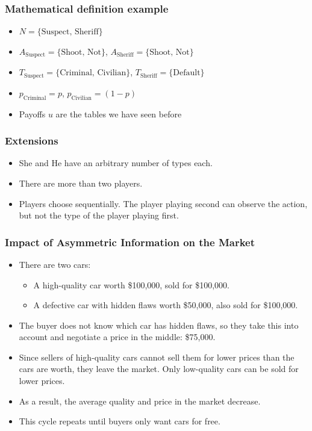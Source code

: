 \documentclass[11pt]{beamer}
\begin{document}
\begin{frame}
    \frametitle{{Mathematical definition example}}
    \begin{itemize}
        \item $N = \{\text{Suspect, Sheriff}\}$
        \item $A_{\text{Suspect}} = \{\text{Shoot, Not}\}$, $A_{\text{Sheriff}} = \{\text{Shoot, Not}\}$
        \item $T_{\text{Suspect}} = \{\text{Criminal, Civilian}\}$, $T_{\text{Sheriff}} = \{ \text{Default} \}$
        \item $p_{\text{Criminal}} = p$, $p_{\text{Civilian}} = (1 - p)$
        \item Payoffs $u$ are the tables we have seen before
    \end{itemize}
\end{frame}


\begin{frame}
    \frametitle{Extensions}
    \begin{itemize}
        \item She and He have an arbitrary number of types each.
        \item There are more than two players.
        \item Players choose sequentially. The player playing second can observe the action, but
        not the type of the player playing first.

    \end{itemize}
\end{frame}


\begin{frame}
    \frametitle{Impact of Asymmetric Information on the Market}

    \begin{itemize}
        \item There are two cars:
        \begin{itemize}
            \item A high-quality car worth \$100,000, sold for \$100,000.
            \item A defective car with hidden flaws worth \$50,000, also sold for \$100,000.
        \end{itemize}
        \item The buyer does not know which car has hidden flaws, so they take this into account and negotiate a price in the middle: \$75,000.
        \item Since sellers of high-quality cars cannot sell them for lower prices than the cars are worth, they leave the market. Only low-quality cars can be sold for lower prices.
        \item As a result, the average quality and price in the market decrease.
        \item This cycle repeats until buyers only want cars for free.
    \end{itemize}
    
\end{frame}
\end{document}
